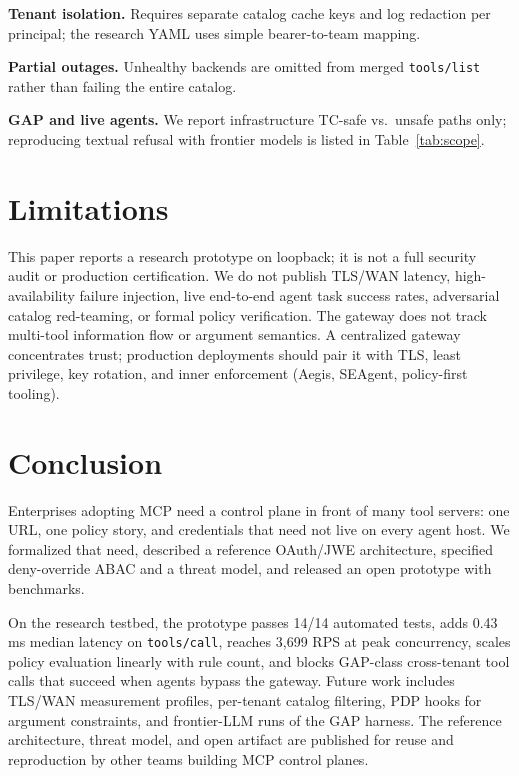 \documentclass[11pt]{article}
\newcommand{\code}[1]{\texttt{#1}}
\newcommand{\aegis}{Aegis}
\newcommand{\seagent}{SEAgent}
\begin{document}
\textbf{Tenant isolation.} Requires separate catalog cache keys and log redaction per principal; the research YAML uses simple bearer-to-team mapping.

\textbf{Partial outages.} Unhealthy backends are omitted from merged \code{tools/list} rather than failing the entire catalog.

\textbf{GAP and live agents.} We report infrastructure TC-safe vs.\ unsafe paths only; reproducing textual refusal with frontier models is listed in Table~\ref{tab:scope}.

\section{Limitations}

This paper reports a research prototype on loopback; it is not a full security audit or production certification.
We do not publish TLS/WAN latency, high-availability failure injection, live end-to-end agent task success rates, adversarial catalog red-teaming, or formal policy verification.
The gateway does not track multi-tool information flow or argument semantics.
A centralized gateway concentrates trust; production deployments should pair it with TLS, least privilege, key rotation, and inner enforcement (\aegis, \seagent, policy-first tooling).

\section{Conclusion}

Enterprises adopting MCP need a control plane in front of many tool servers: one URL, one policy story, and credentials that need not live on every agent host.
We formalized that need, described a reference OAuth/JWE architecture, specified deny-override ABAC and a threat model, and released an open prototype with benchmarks.

On the research testbed, the prototype passes 14/14 automated tests, adds 0.43\,ms median latency on \code{tools/call}, reaches 3{,}699 RPS at peak concurrency, scales policy evaluation linearly with rule count, and blocks GAP-class cross-tenant tool calls that succeed when agents bypass the gateway.
Future work includes TLS/WAN measurement profiles, per-tenant catalog filtering, PDP hooks for argument constraints, and frontier-LLM runs of the GAP harness.
The reference architecture, threat model, and open artifact are published for reuse and reproduction by other teams building MCP control planes.



\end{document}
